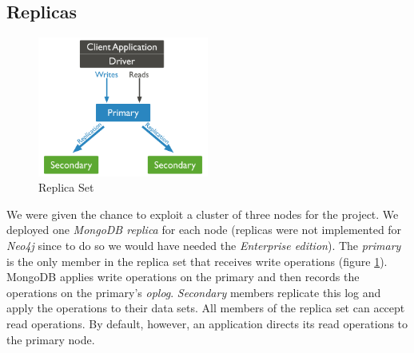\subsection{Replicas}
\begin{figure}[hbt!]
	\centering
	\includegraphics[width=0.5\textwidth]{chapter3/img/replica.png}
	\caption{Replica Set}
	\label{fig:replica}
\end{figure}
We were given the chance to exploit a cluster of three nodes for the project. We deployed one \emph{MongoDB replica} for each node (replicas were not implemented for \emph{Neo4j} since to do so we would have needed the \emph{Enterprise edition}). 
The \emph{primary} is the only member in the replica set that receives write operations (figure \ref{fig:replica}). MongoDB applies write operations on the primary and then records the operations on the primary's \emph{oplog}. \emph{Secondary} members replicate this log and apply the operations to their data sets.
All members of the replica set can accept read operations. By default, however, an application directs its read operations to the primary node.
